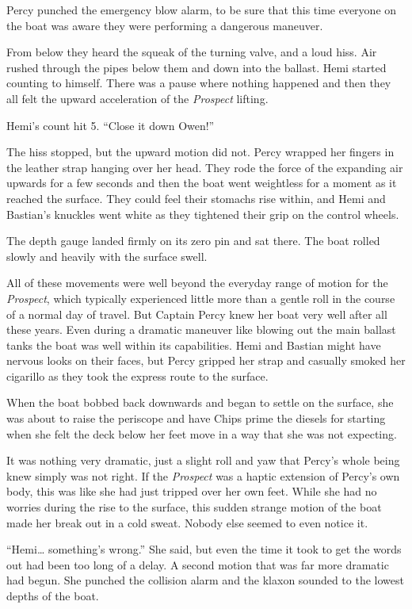 \documentclass[
]{scrbook}
\begin{document}
Percy punched the emergency blow alarm, to be sure that this time
everyone on the boat was aware they were performing a dangerous
maneuver.

From below they heard the squeak of the turning valve, and a loud hiss.
Air rushed through the pipes below them and down into the ballast. Hemi
started counting to himself. There was a pause where nothing happened
and then they all felt the upward acceleration of the \emph{Prospect}
lifting.

Hemi's count hit 5. ``Close it down Owen!''

The hiss stopped, but the upward motion did not. Percy wrapped her
fingers in the leather strap hanging over her head. They rode the force
of the expanding air upwards for a few seconds and then the boat went
weightless for a moment as it reached the surface. They could feel their
stomachs rise within, and Hemi and Bastian's knuckles went white as they
tightened their grip on the control wheels.

The depth gauge landed firmly on its zero pin and sat there. The boat
rolled slowly and heavily with the surface swell.

All of these movements were well beyond the everyday range of motion for
the \emph{Prospect}, which typically experienced little more than a
gentle roll in the course of a normal day of travel. But Captain Percy
knew her boat very well after all these years. Even during a dramatic
maneuver like blowing out the main ballast tanks the boat was well
within its capabilities. Hemi and Bastian might have nervous looks on
their faces, but Percy gripped her strap and casually smoked her
cigarillo as they took the express route to the surface.

When the boat bobbed back downwards and began to settle on the surface,
she was about to raise the periscope and have Chips prime the diesels
for starting when she felt the deck below her feet move in a way that
she was not expecting.

It was nothing very dramatic, just a slight roll and yaw that Percy's
whole being knew simply was not right. If the \emph{Prospect} was a
haptic extension of Percy's own body, this was like she had just tripped
over her own feet. While she had no worries during the rise to the
surface, this sudden strange motion of the boat made her break out in a
cold sweat. Nobody else seemed to even notice it.

``Hemi\ldots{} something's wrong.'' She said, but even the time it took
to get the words out had been too long of a delay. A second motion that
was far more dramatic had begun. She punched the collision alarm and the
klaxon sounded to the lowest depths of the boat.
\end{document}
